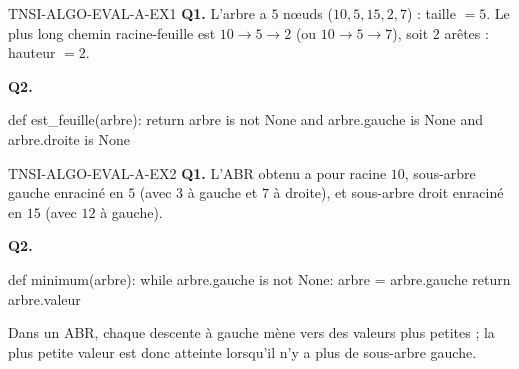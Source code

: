 \begin{corrige}{TNSI-ALGO-EVAL-A-EX1}
\textbf{Q1.} L'arbre a $5$ nœuds ($10, 5, 15, 2, 7$) : taille $= 5$. Le plus long chemin racine-feuille est $10 \to 5 \to 2$ (ou $10 \to 5 \to 7$), soit $2$ arêtes : hauteur $= 2$.

\textbf{Q2.}
\begin{python}
def est_feuille(arbre):
    return arbre is not None and arbre.gauche is None and arbre.droite is None
\end{python}
\end{corrige}

\begin{corrige}{TNSI-ALGO-EVAL-A-EX2}
\textbf{Q1.} L'ABR obtenu a pour racine $10$, sous-arbre gauche enraciné en $5$ (avec $3$ à gauche et $7$ à droite), et sous-arbre droit enraciné en $15$ (avec $12$ à gauche).

\textbf{Q2.}
\begin{python}
def minimum(arbre):
    while arbre.gauche is not None:
        arbre = arbre.gauche
    return arbre.valeur
\end{python}
Dans un ABR, chaque descente à gauche mène vers des valeurs plus petites ; la plus petite valeur est donc atteinte lorsqu'il n'y a plus de sous-arbre gauche.
\end{corrige}
